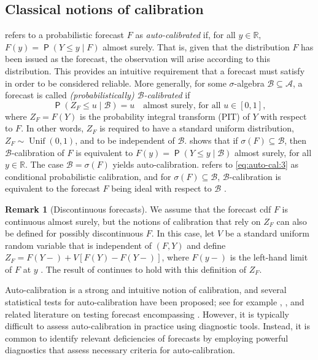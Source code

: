 \documentclass[12pt]{article}
\newcommand{\Q}{\operatorname{\mathsf{P}}}
\newcommand{\R}{\mathbb{R}}
\newcommand{\Aa}{\mathcal{A}}
\newcommand{\Bb}{\mathcal{B}}
\newcommand{\1}{\mathbf{1}} %
\newcommand{\Unif}{\operatorname{Unif}} %
\theoremstyle{definition}
\newtheorem{remark}[propo]{Remark}
\begin{document}
\subsection{Classical notions of calibration}

\cite{Tsyplakov2011} refers to a probabilistic forecast $F$ as \emph{auto-calibrated} if, for all $y \in \R$, $F(y) = \Q ( Y \leq y \mid F)$ almost surely. That is, given that the distribution $F$ has been issued as the forecast, the observation will arise according to this distribution. This provides an intuitive requirement that a forecast must satisfy in order to be considered reliable. More generally, for some $\sigma$-algebra $\Bb\subseteq \Aa$, a forecast is called \emph{(probabilistically) $\Bb$-calibrated} if 
\begin{equation}\label{eq:auto-cal:3}
    \Q(Z_F \le u \mid \Bb ) = u \quad \text{almost surely, for all $u \in [0,1]$},
\end{equation}
where $Z_F = F(Y)$ is the probability integral transform (PIT) of $Y$ with respect to $F$. In other words, $Z_F$ is required to have a standard uniform distribution, $Z_F\sim \Unif(0,1)$, and to be independent of $\Bb$. \citet[Proposition~3.4]{Modeste2023} shows that if $\sigma(F)\subseteq \Bb$, then $\Bb$-calibration of $F$ is equivalent to  $F(y) = \Q ( Y \leq y \mid \Bb)$ almost surely, for all $y \in \R$. The case $\Bb = \sigma(F)$ yields auto-calibration. \citet[Definition~3]{Tsyplakov2014} refers to \eqref{eq:auto-cal:3} as conditional probabilistic calibration, and for $\sigma(F)\subseteq \Bb$, $\Bb$-calibration is equivalent to the forecast $F$ being ideal with respect to $\Bb$ \citep{GneitingRanjan2013}.

\begin{remark}[Discontinuous forecasts]
\label{rem:F_jumps}
We assume that the forecast cdf $F$ is continuous almost surely, but the notions of calibration that rely on $Z_F$ can also be defined for possibly discontinuous $F$. In this case, let $V$ be a standard uniform random variable that is independent of $(F,Y)$ and define $Z_F = F(Y-) + V[ F(Y) - F(Y-) ] $, where $F(y-)$ is the left-hand limit of $F$ at $y$ \citep[Definition 2.5]{GneitingRanjan2013}. The result of \citet[Proposition 3.4]{Modeste2023} continues to hold with this definition of $Z_F$.
\end{remark}

Auto-calibration is a strong and intuitive notion of calibration, and several statistical tests for auto-calibration have been proposed; see for example \citet{StrahlZiegel2017}, \citet{Modeste2023}, and related literature on testing forecast encompassing \citep{HarveyLeybourneETAL1998}. However, it is typically difficult to assess auto-calibration in practice using diagnostic tools. Instead, it is common to identify relevant deficiencies of forecasts by employing powerful diagnostics that assess necessary criteria for auto-calibration.
\end{document}
